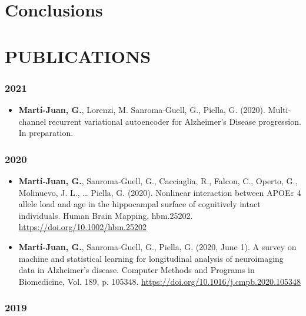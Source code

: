 \documentclass[12pt, b5paper,twoside]{tesi_upf}
\begin{document}
\chapter{Conclusions} \label{ch:6-conclusions}


\backmatter




\chapter*{PUBLICATIONS}

\subsection*{2021}

\begin{itemize}
\item \textbf{Martí-Juan, G.}, Lorenzi, M. Sanroma‐Guell, G., Piella, G. (2020). Multi-channel recurrent variational autoencoder for Alzheimer's Disease progression. In preparation.
\end{itemize}

\subsection*{2020}

\begin{itemize}
\item \textbf{Martí‐Juan, G.}, Sanroma‐Guell, G., Cacciaglia, R., Falcon, C., Operto, G., Molinuevo, J. L., … Piella, G. (2020). Nonlinear interaction between APOE$\varepsilon$ 4 allele load and age in the hippocampal surface of cognitively intact individuals. Human Brain Mapping, hbm.25202. \url{https://doi.org/10.1002/hbm.25202}

\item \textbf{Martí-Juan, G.}, Sanroma-Guell, G., Piella, G. (2020, June 1). A survey on machine and statistical learning for longitudinal analysis of neuroimaging data in Alzheimer’s disease. Computer Methods and Programs in Biomedicine, Vol. 189, p. 105348. \url{https://doi.org/10.1016/j.cmpb.2020.105348}
\end{itemize}

\subsection*{2019}
\end{document}
